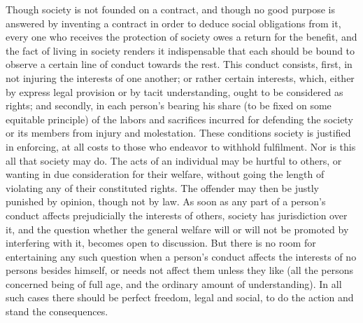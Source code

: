 \documentclass[12pt]{report}
\begin{document}
Though society is not founded on a contract, and though no good purpose is answered by inventing a contract in order to deduce social obligations from it, every one who receives the protection of society owes a return for the benefit, and the fact of living in society renders it indispensable that each should be bound to observe a certain line of conduct towards the rest. This conduct consists, first, in not injuring the interests of one another; or rather certain interests, which, either by express legal provision or by tacit understanding, ought to be considered as rights; and secondly, in each person's bearing his share (to be fixed on some equitable principle) of the labors and sacrifices incurred for defending the society or its members from injury and molestation. These conditions society is justified in enforcing, at all costs to those who endeavor to withhold fulfilment. Nor is this all that society may do. The acts of an individual may be hurtful to others, or wanting in due consideration for their welfare, without going the length of violating any of their constituted rights. The offender may then be justly punished by opinion, though not by law. As soon as any part of a person's conduct affects prejudicially the interests of others, society has jurisdiction over it, and the question whether the general welfare will or will not be promoted by interfering with it, becomes open to discussion. But there is no room for entertaining any such question when a person's conduct affects the interests of no persons besides himself, or needs not affect them unless they like (all the persons concerned being of full age, and the ordinary amount of understanding). In all such cases there should be perfect freedom, legal and social, to do the action and stand the consequences.
\end{document}

